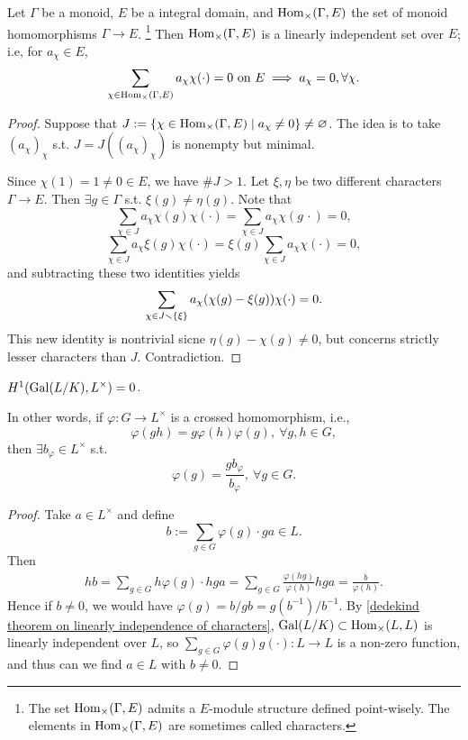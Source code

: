 \begin{theorem}\label{dedekind theorem on linearly independence of characters}
    Let $\Gamma$ be a monoid, $E$ be a integral domain, and $\operatorname{Hom}_{\times}(\Gamma, E)$ the set of monoid homomorphisms $\Gamma\to E$.
    \footnote{
        The set $\operatorname{Hom}_{\times}(\Gamma, E)$ admits a $E$-module structure defined point-wisely.
        The elements in $\operatorname{Hom}_{\times}(\Gamma, E)$ are sometimes called characters.
    }
    Then $\operatorname{Hom}_{\times}(\Gamma, E)$ is a linearly independent set over $E$; i.e, for $a_\chi\in E$,
    \[\sum_{\chi\in\operatorname{Hom}_{\times}(\Gamma, E)} a_\chi\chi(\cdot) = 0\text{ on }E
    \implies a_\chi = 0,\forall\chi.\]
\end{theorem}
\begin{proof}
    Suppose that $J := \{\chi\in\operatorname{Hom}_{\times}(\Gamma, E)\mid a_\chi\ne 0\}\ne\varnothing$.
    The idea is to {\color{blue} take $(a_\chi)_\chi$ s.t.
    $J = J((a_\chi)_\chi)$ is nonempty but minimal}.

    Since $\chi(1) = 1\ne 0\in E$, we have $\# J > 1$.
    Let $\xi, \eta$ be two different characters $\Gamma\to E$. Then $\exists g\in\Gamma$ s.t. $\xi(g)\ne \eta(g)$.
    Note that \[\sum_{\chi\in J} a_\chi \chi(g)\chi(\cdot) = \sum_{\chi\in J} a_\chi\chi(g\,\cdot) = 0,\]
    \[\sum_{\chi\in J}a_\chi\xi(g)\chi(\cdot) = \xi(g)\sum_{\chi\in J}a_\chi\chi(\cdot) = 0,\]
    and subtracting these two identities yields
    \[\sum_{\chi\in J\smallsetminus\{\xi\}} a_\chi(\chi(g) - \xi(g))\chi(\cdot) = 0.\]
    This new identity is nontrivial sicne $\eta(g) - \chi(g)\ne 0$, but concerns strictly lesser characters than $J$. Contradiction.
\end{proof}

\begin{proposition}\label{Hilbert 90 - multiplicative - cohomology}
    $H^1(\operatorname{Gal}(L/K), L^\times) = 0$.\par
    In other words, if $\varphi : G\to L^\times$ is a crossed homomorphism, i.e., \[\varphi(gh) = g\varphi(h)\varphi(g),\ \forall g, h\in G,\]
    then $\exists b_\varphi\in L^\times$ s.t. \[\varphi(g) = \frac{g b_\varphi}{b_\varphi},\ \forall g\in G.\]
\end{proposition}
\begin{proof}
    Take $a\in L^\times$ and define \[b := \sum_{g\in G}\varphi(g)\cdot ga\in L.\]
    Then \begin{align*}
        hb = \sum_{g\in G} h\varphi(g)\cdot hga
        = \sum_{g\in G}\frac{\varphi(hg)}{\varphi(h)} hga = \frac{b}{\varphi(h)}.
    \end{align*}
    Hence if $b\ne 0$, we would have $\varphi(g) = b/gb = g(b^{-1})/b^{-1}$.
    By \cref{dedekind theorem on linearly independence of characters},
    $\operatorname{Gal}(L/K)\subset \operatorname{Hom}_\times(L, L)$ is linearly independent over $L$,
    so $\sum_{g\in G}\varphi(g)g(\cdot) : L\to L$ is a non-zero function, and thus can we find $a\in L$ with $b\ne 0$.
\end{proof}

